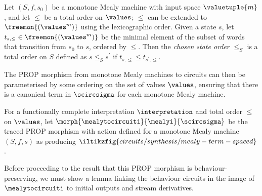 \begin{definition}
    Let \((S, f, s_0)\) be a monotone Mealy machine with input space
    \(\valuetuple{m}\), and let \(\leq\) be a total order on \(\values\);
    \(\leq\) can be extended to \(\freemon{(\values^m)}\) using the
    lexicographic order.
    Given a state \(s\), let \(t_{s,\leq} \in \freemon{(\values^m)}\) be
    the minimal element of the subset of words that transition from \(s_0\) to
    \(s\), ordered by \(\leq\).
    Then the \emph{chosen state order} \(\leq_S\) is a total order on \(S\)
    defined as \(s \leq_S s^\prime\) if \(t_{s,\leq} \leq t_{s^\prime,\leq}\).
\end{definition}

The PROP morphism from monotone Mealy machines to circuits can then be
parameterised by some ordering on the set of values \(\values\), ensuring that
there is a canonical term in \(\scircsigma\) for each monotone Mealy machine.

\begin{definition}\label{def:mealy-to-circuit}
    For a functionally complete interpretation \(\interpretation\) and total
    order \(\leq\) on \(\values\), let \(
    \morph{
        \mealytocircuiti
    }{
        \mealyi
    }{
        \scircsigma
    }
    \) be the traced PROP morphism with action defined for a monotone Mealy
    machine \((S,f,s)\) as producing \(
    \iltikzfig{circuits/synthesis/mealy-term-spaced}
    \).
\end{definition}

Before proceeding to the result that this PROP morphism is behaviour-preserving,
we must show a lemma linking the behaviour circuits in the image of
\(\mealytocircuiti\) to initial outputs and stream derivatives.

